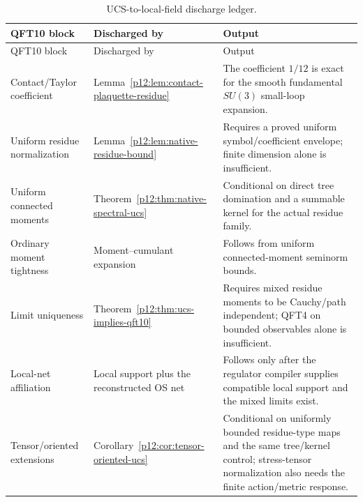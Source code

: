 \documentclass[12pt,a4paper]{article}
\begin{document}
\begin{longtable}{>{\raggedright\arraybackslash}p{} >{\raggedright\arraybackslash}p{} >{\raggedright\arraybackslash}p{}}
\caption[UCS-to-local-field discharge ledger]{UCS-to-local-field discharge ledger.}\label{p12:tab:ucs-local-field-discharge}\\
\toprule
QFT10 block & Discharged by & Output \\
\midrule
\endfirsthead
\toprule
QFT10 block & Discharged by & Output \\
\midrule
\endhead
Contact/Taylor coefficient & Lemma~\ref{p12:lem:contact-plaquette-residue} & The coefficient \(1/12\) is exact for the smooth fundamental \(SU(3)\) small-loop expansion. \\
Uniform residue normalization & Lemma~\ref{p12:lem:native-residue-bound} & Requires a proved uniform symbol/coefficient envelope; finite dimension alone is insufficient. \\
Uniform connected moments & Theorem~\ref{p12:thm:native-spectral-ucs} & Conditional on direct tree domination and a summable kernel for the actual residue family. \\
Ordinary moment tightness & Moment--cumulant expansion & Follows from uniform connected-moment seminorm bounds. \\
Limit uniqueness & Theorem~\ref{p12:thm:ucs-implies-qft10} & Requires mixed residue moments to be Cauchy/path independent; QFT4 on bounded observables alone is insufficient. \\
Local-net affiliation & Local support plus the reconstructed OS net & Follows only after the regulator compiler supplies compatible local support and the mixed limits exist. \\
Tensor/oriented extensions & Corollary~\ref{p12:cor:tensor-oriented-ucs} & Conditional on uniformly bounded residue-type maps and the same tree/kernel control; stress-tensor normalization also needs the finite action/metric response. \\
\bottomrule
\end{longtable}
\end{document}

